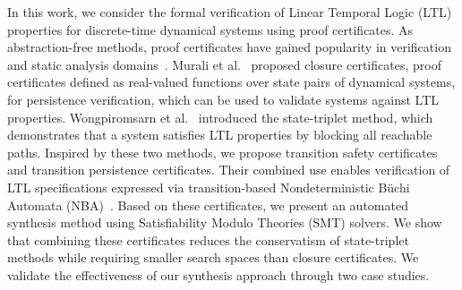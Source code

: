 In this work, we consider the formal verification of Linear Temporal Logic (LTL) properties for discrete-time dynamical systems using proof certificates. As abstraction-free methods, proof certificates have gained popularity in verification and static analysis domains~\cite{chakarov2013probabilistic,chatterjee2016algorithmic,chatterjee2024sound,chatterjee2024equivalence}. Murali et al.~\cite{murali2024closure} proposed closure certificates, proof certificates defined as real-valued functions over state pairs of dynamical systems, for persistence verification, which can be used to validate systems against LTL properties. Wongpiromsarn et al.~\cite{wongpiromsarn2015automata} introduced the state-triplet method, which demonstrates that a system satisfies LTL properties by blocking all reachable paths. Inspired by these two methods, we propose transition safety certificates and transition persistence certificates. Their combined use enables verification of LTL specifications expressed via transition-based Nondeterministic Büchi Automata (NBA)~\cite{buchi1966symposium}. Based on these certificates, we present an automated synthesis method using Satisfiability Modulo Theories (SMT) solvers. We show that combining these certificates reduces the conservatism of state-triplet methods while requiring smaller search spaces than closure certificates. We validate the effectiveness of our synthesis approach through two case studies.

